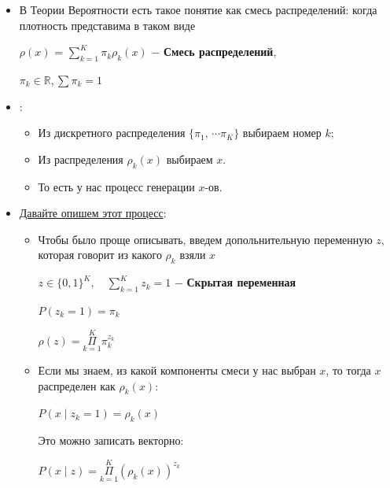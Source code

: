             \begin{itemize}
                \item В Теории Вероятности есть такое понятие как смесь распределений: когда плотность представима в таком виде
                \begin{center}
                \Large
                    $\rho(x)$ = $\sum\limits_{k = 1}^K \pi_k \rho_k(x)$ $-$ \textbf{Смесь распределений}, 
                \end{center}
                $\pi_k \in \mathbb{R}, \sum  \pi_k = 1$

                \item \underline{}:
                \begin{itemize}
                    \item Из дискретного распределения  $\{\pi_1, \, \cdots \pi_K \}$ выбираем номер $k$;

                    \item Из распределения $\rho_k(x)$ выбираем $x$.

                    \item То есть у нас процесс генерации $x$-ов.
                \end{itemize}

                \item \underline{Давайте опишем этот процесс}:
                \begin{itemize}
                    \item Чтобы было проще описывать, введем допольнительную переменную $z$, которая говорит из какого $\rho_k$ взяли $x$
                    \begin{center}
                    \large
                        $z \in \{0 , 1 \}^K, \quad \sum\limits_{k = 1}^K z_k = 1$ $-$ \textbf{Скрытая переменная}
                    \end{center}
                    \begin{center}
                        \large
                        $P (z_k = 1) = \pi_k$
                    \end{center}
                    \begin{center}
                        \large
                        $\rho(z) = \Pi\limits_{k = 1}^K \pi_k^{z_k}$
                    \end{center}

                    \item Если мы знаем, из какой компоненты смеси у нас выбран $x$, то тогда $x$ распределен как $\rho_k(x)$:
                    \begin{center}
                        \large
                        $P(x \mid z_k = 1) = \rho_k(x)$
                    \end{center}
                    Это можно записать векторно:
                    \begin{center}
                        \large
                        $P(x \mid z) = \Pi\limits_{k = 1}^K (\rho_k(x))^{z_k}$ 
                    \end{center}


\end{itemize}
\end{itemize}
